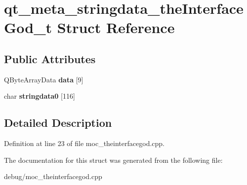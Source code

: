 \hypertarget{structqt__meta__stringdata__the_interface_god__t}{}\section{qt\+\_\+meta\+\_\+stringdata\+\_\+the\+Interface\+God\+\_\+t Struct Reference}
\label{structqt__meta__stringdata__the_interface_god__t}
\subsection*{Public Attributes}
\begin{DoxyCompactItemize}
\item 
\mbox{\label{structqt__meta__stringdata__the_interface_god__t_af8cd20711806295c9214d366c2e049b1}} 
Q\+Byte\+Array\+Data {\bfseries data} \mbox{[}9\mbox{]}
\item 
\mbox{\label{structqt__meta__stringdata__the_interface_god__t_a761f62607a4d422abbae792c165f7d0d}} 
char {\bfseries stringdata0} \mbox{[}116\mbox{]}
\end{DoxyCompactItemize}


\subsection{Detailed Description}


Definition at line 23 of file moc\+\_\+theinterfacegod.\+cpp.



The documentation for this struct was generated from the following file\+:\begin{DoxyCompactItemize}
\item 
debug/moc\+\_\+theinterfacegod.\+cpp\end{DoxyCompactItemize}
